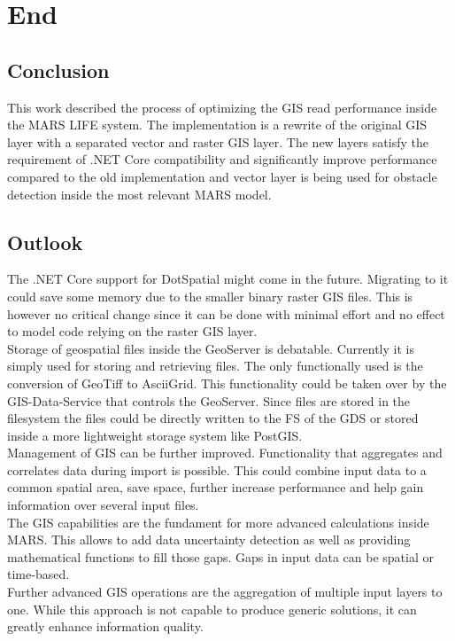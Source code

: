 
\chapter{End}



\section{Conclusion}
This work described the process of optimizing the GIS read performance inside the MARS LIFE system. The implementation is a rewrite of the original GIS layer with a separated vector and raster GIS layer. The new layers satisfy the requirement of .NET Core compatibility and significantly improve performance compared to the old implementation and vector layer is being used for obstacle detection inside the most relevant MARS model.


\section{Outlook}
The .NET Core support for DotSpatial might come in the future. Migrating to it could save some memory due to the smaller binary raster GIS files. This is however no critical change since it can be done with minimal effort and no effect to model code relying on the raster GIS layer.\\
Storage of geospatial files inside the GeoServer is debatable. Currently it is simply used for storing and retrieving files. The only functionally used is the conversion of GeoTiff to AsciiGrid. This functionality could be taken over by the GIS-Data-Service that controls the GeoServer. Since files are stored in the filesystem the files could be directly written to the FS of the GDS or stored inside a more lightweight storage system like PostGIS.\\
Management of GIS can be further improved. Functionality that aggregates and correlates data during import is possible. This could combine input data to a common spatial area, save space, further increase performance and help gain information over several input files.\\
The GIS capabilities are the fundament for more advanced calculations inside MARS. This allows to add data uncertainty detection as well as providing mathematical functions to fill those gaps. Gaps in input data can be spatial or time-based.\\
Further advanced GIS operations are the aggregation of multiple input layers to one. While this approach is not capable to produce generic solutions, it can greatly enhance information quality.
